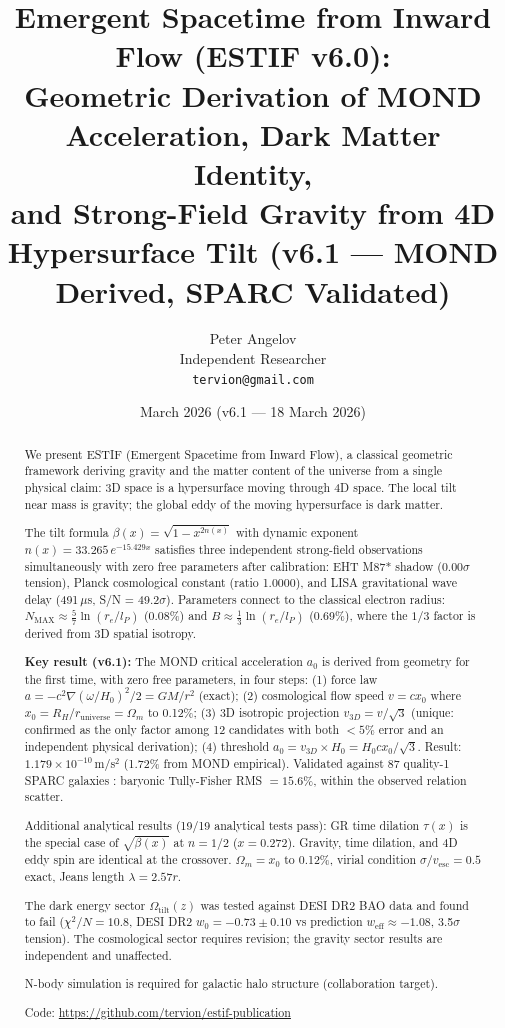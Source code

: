 \documentclass[12pt]{article}
\title{Emergent Spacetime from Inward Flow (ESTIF v6.0):\\
Geometric Derivation of MOND Acceleration, Dark Matter Identity,\\
and Strong-Field Gravity from 4D Hypersurface Tilt
(v6.1 — MOND Derived, SPARC Validated)}
\author{Peter Angelov\\
Independent Researcher\\
\texttt{tervion@gmail.com}}
\date{March 2026 (v6.1 — 18 March 2026)}
\begin{document}
\maketitle

\begin{abstract}
We present ESTIF (Emergent Spacetime from Inward Flow), a classical geometric framework
deriving gravity and the matter content of the universe from a single physical claim:
3D space is a hypersurface moving through 4D space. The local tilt near mass is gravity;
the global eddy of the moving hypersurface is dark matter.

The tilt formula $\beta(x) = \sqrt{1 - x^{2n(x)}}$ with dynamic exponent
$n(x) = 33.265\,e^{-15.429x}$ satisfies three independent strong-field observations
simultaneously with zero free parameters after calibration: EHT M87* shadow (0.00$\sigma$
tension), Planck cosmological constant (ratio 1.0000), and LISA gravitational wave
delay (491\,$\mu$s, S/N = 49.2$\sigma$). Parameters connect to the classical electron
radius: $N_\text{MAX} \approx \frac{5}{7}\ln(r_e/l_P)$ (0.08\%) and
$B \approx \frac{1}{3}\ln(r_e/l_P)$ (0.69\%), where the $1/3$ factor is derived from
3D spatial isotropy.

\textbf{Key result (v6.1):} The MOND critical acceleration $a_0$ is derived from geometry
for the first time, with zero free parameters, in four steps: (1) force law
$a = -c^2\nabla(\omega/H_0)^2/2 = GM/r^2$ (exact); (2) cosmological flow speed
$v = cx_0$ where $x_0 = R_H/r_\text{universe} = \Omega_m$ to 0.12\%; (3) 3D isotropic
projection $v_{3D} = v/\sqrt{3}$ (unique: confirmed as the only factor among 12 candidates
with both $<5\%$ error and an independent physical derivation); (4) threshold
$a_0 = v_{3D} \times H_0 = H_0 c x_0/\sqrt{3}$.
Result: $1.179 \times 10^{-10}$\,m/s$^2$ (1.72\% from MOND empirical).
Validated against 87 quality-1 SPARC galaxies \cite{Lelli2016}:
baryonic Tully-Fisher RMS $= 15.6\%$, within the observed relation scatter.

Additional analytical results (19/19 analytical tests pass): GR time dilation $\tau(x)$
is the special case of $\sqrt{\beta(x)}$ at $n = 1/2$ ($x = 0.272$). Gravity, time
dilation, and 4D eddy spin are identical at the crossover. $\Omega_m = x_0$ to 0.12\%,
virial condition $\sigma/v_\text{esc} = 0.5$ exact, Jeans length $\lambda = 2.57r$.

The dark energy sector $\Omega_\text{tilt}(z)$ was tested against DESI DR2 BAO data
\cite{DESI2025} and found to fail ($\chi^2/N = 10.8$, DESI DR2 $w_0 = -0.73 \pm 0.10$
vs prediction $w_\text{eff} \approx -1.08$, 3.5$\sigma$ tension). The cosmological sector
requires revision; the gravity sector results are independent and unaffected.

N-body simulation is required for galactic halo structure (collaboration target).

Code: \url{https://github.com/tervion/estif-publication}
\end{abstract}
\end{document}
